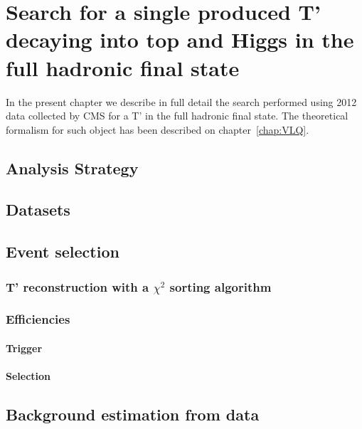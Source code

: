 \chapter[Single VLQ search]{Search for a single produced T' decaying into top and Higgs in the full hadronic final state}
\label{chap:search}

In the present chapter we describe in full detail the search performed using 2012 data collected by CMS for a T' in the full hadronic final state. The theoretical formalism for such object has been described on chapter~\ref{chap:VLQ}.

\section{Analysis Strategy}
\label{sec:stra}

\section{Datasets}
\label{sec:data}

\section{Event selection}
\label{sec:sel}

\subsection{T' reconstruction with a $\chi^{2}$ sorting algorithm}
\label{sec:chi2}

\subsection{Efficiencies}
\label{sec:eff}

\subsubsection{Trigger}
\label{sec:trigger}

\subsubsection{Selection}
\label{sec:seleff}

\section{Background estimation from data}
\label{sec:bkg}

